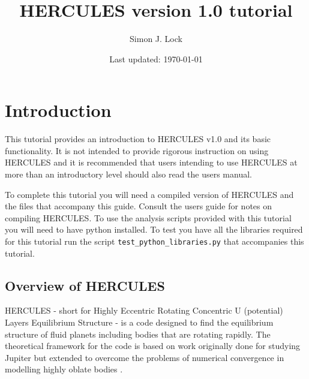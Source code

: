 \documentclass[11pt, oneside]{article}   	%
\title{HERCULES version 1.0 tutorial}
\author{Simon J. Lock}
\date{Last updated:  \today }							%
\begin{document}
\maketitle

\makeatletter
{}
\makeatother

\clearpage
\clearpage

\section{Introduction}

This tutorial provides an introduction to HERCULES v1.0 and its basic functionality. It is not intended to provide rigorous instruction on using HERCULES and it is recommended that users intending to use HERCULES at more than an introductory level should also read the users manual. 

To complete this tutorial you will need a compiled version of HERCULES and the files that accompany this guide. Consult the users guide for notes on compiling HERCULES. To use the analysis scripts provided with this tutorial you will need to have python installed. To test you have all the libraries required for this tutorial run the script \texttt{test\_python\_libraries.py} that accompanies this tutorial.

\subsection{Overview of HERCULES}

HERCULES - short for Highly Eccentric Rotating Concentric U (potential) Layers Equilibrium Structure - is a code designed to find the equilibrium structure of fluid planets including bodies that are rotating rapidly. The theoretical framework for the code is based on work originally done for studying Jupiter \citep{Hubbard2012, Hubbard2013}  but extended to overcome the problems of numerical convergence in modelling highly oblate bodies \citep{Hubbard2014, Kong2013}.
\end{document}

